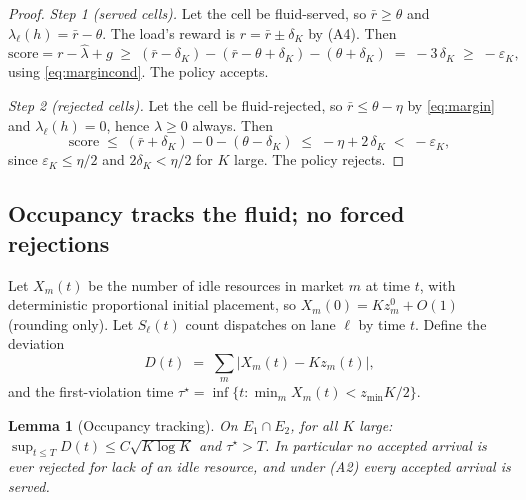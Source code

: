 \documentclass[11pt]{article}
\newtheorem{lemma}{Lemma}
\begin{document}
\begin{proof}
\emph{Step 1 (served cells).} Let the cell be fluid-served, so
$\bar{r} \geq \theta$ and $\lambda_{\ell}(h) = \bar{r} - \theta$. The
load's reward is $r = \bar{r} \pm \delta_K$ by (A4). Then
\begin{equation}
  \mathrm{score}
  = r - \hat{\lambda} + g
  \;\geq\; (\bar{r} - \delta_K) - (\bar{r} - \theta + \delta_K)
  - (\theta + \delta_K)
  \;=\; -3\,\delta_K
  \;\geq\; -\varepsilon_K,
\end{equation}
using \eqref{eq:margincond}. The policy accepts.

\emph{Step 2 (rejected cells).} Let the cell be fluid-rejected, so
$\bar{r} \leq \theta - \eta$ by \eqref{eq:margin} and
$\lambda_{\ell}(h) = 0$, hence $\hat{\lambda} \geq 0$ always. Then
\begin{equation}
  \mathrm{score}
  \;\leq\; (\bar{r} + \delta_K) - 0 - (\theta - \delta_K)
  \;\leq\; -\eta + 2\,\delta_K
  \;<\; -\varepsilon_K,
\end{equation}
since $\varepsilon_K \leq \eta/2$ and $2\delta_K < \eta/2$ for $K$
large. The policy rejects.
\end{proof}

\subsection{Occupancy tracks the fluid; no forced rejections}

Let $X_m(t)$ be the number of idle resources in market $m$ at time
$t$, with deterministic proportional initial placement, so
$X_m(0) = K z^0_m + O(1)$ (rounding only). Let $S_{\ell}(t)$ count
dispatches on lane $\ell$ by time $t$. Define the deviation
\begin{equation}
  D(t) \;=\; \sum_{m} \bigl| X_m(t) - K z_m(t) \bigr|,
\end{equation}
and the first-violation time
$\tau^{\star} = \inf\{ t : \min_m X_m(t) < z_{\min} K / 2 \}$.

\begin{lemma}[Occupancy tracking]
\label{lem:track}
On $E_1 \cap E_2$, for all $K$ large:
$\sup_{t \leq T} D(t) \leq C \sqrt{K \log K}$ and
$\tau^{\star} > T$. In particular no accepted arrival is ever rejected
for lack of an idle resource, and under (A2) every accepted arrival is
served.
\end{lemma}
\end{document}

